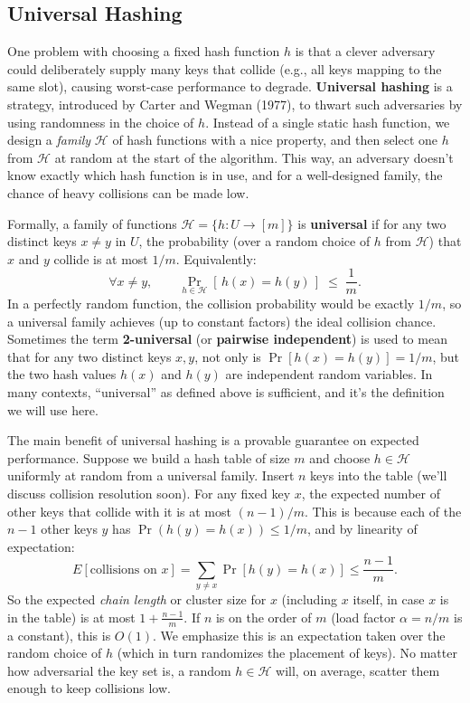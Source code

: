 \documentclass[11pt]{article}
\begin{document}
\subsection{Universal Hashing}
One problem with choosing a fixed hash function $h$ is that a clever adversary could deliberately supply many keys that collide (e.g., all keys mapping to the same slot), causing worst-case performance to degrade. \textbf{Universal hashing} is a strategy, introduced by Carter and Wegman (1977), to thwart such adversaries by using randomness in the choice of $h$. Instead of a single static hash function, we design a \emph{family} $\mathcal{H}$ of hash functions with a nice property, and then select one $h$ from $\mathcal{H}$ at random at the start of the algorithm. This way, an adversary doesn’t know exactly which hash function is in use, and for a well-designed family, the chance of heavy collisions can be made low.

Formally, a family of functions $\mathcal{H} = \{h: U \to [m]\}$ is \textbf{universal} if for any two distinct keys $x \neq y$ in $U$, the probability (over a random choice of $h$ from $\mathcal{H}$) that $x$ and $y$ collide is at most $1/m$. Equivalently:
\[ \forall x \neq y, \qquad \Pr_{h \in \mathcal{H}}[\,h(x) = h(y)\,] \;\le\; \frac{1}{m}. \] 
In a perfectly random function, the collision probability would be exactly $1/m$, so a universal family achieves (up to constant factors) the ideal collision chance. Sometimes the term \textbf{2-universal} (or \textbf{pairwise independent}) is used to mean that for any two distinct keys $x,y$, not only is $\Pr[h(x)=h(y)]=1/m$, but the two hash values $h(x)$ and $h(y)$ are independent random variables. In many contexts, “universal” as defined above is sufficient, and it’s the definition we will use here.

The main benefit of universal hashing is a provable guarantee on expected performance. Suppose we build a hash table of size $m$ and choose $h \in \mathcal{H}$ uniformly at random from a universal family. Insert $n$ keys into the table (we’ll discuss collision resolution soon). For any fixed key $x$, the expected number of other keys that collide with it is at most $(n-1)/m$. This is because each of the $n-1$ other keys $y$ has $\Pr(h(y)=h(x)) \le 1/m$, and by linearity of expectation:
\[ E[\text{collisions on }x] = \sum_{y \neq x} \Pr[h(y)=h(x)] \le \frac{n-1}{m}. \]
So the expected \emph{chain length} or cluster size for $x$ (including $x$ itself, in case $x$ is in the table) is at most $1 + \frac{n-1}{m}$. If $n$ is on the order of $m$ (load factor $\alpha = n/m$ is a constant), this is $O(1)$. We emphasize this is an expectation taken over the random choice of $h$ (which in turn randomizes the placement of keys). No matter how adversarial the key set is, a random $h \in \mathcal{H}$ will, on average, scatter them enough to keep collisions low.
\end{document}

